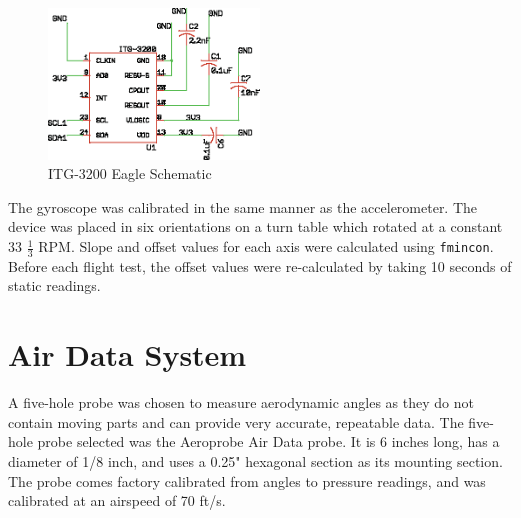 \begin{figure}[H]
  \centering
    \includegraphics[width=0.5\textwidth]{figures/itg3200Schematic.eps}
      \caption{ITG-3200 Eagle Schematic}
      \label{itg3200Schematic}
\end{figure}

The gyroscope was calibrated in the same manner as the accelerometer. The device was placed in six orientations on a turn table which rotated at a constant 33 $\frac{1}{3}$ RPM. Slope and offset values for each axis were calculated using \texttt{fmincon}. Before each flight test, the offset values were re-calculated by taking 10 seconds of static readings.\\

\section{Air Data System}
A five-hole probe was chosen to measure aerodynamic angles as they do not contain moving parts and can provide very accurate, repeatable data. The five-hole probe selected was the Aeroprobe Air Data probe. It is 6 inches long, has a diameter of 1/8 inch, and uses a 0.25" hexagonal section as its mounting section. The probe comes factory calibrated from angles to pressure readings, and was calibrated at an airspeed of 70 ft/s.

